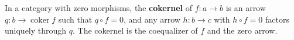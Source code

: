 In a category with zero morphisms, the \textbf{cokernel} of $f: a \rightarrow b$ is an arrow $q: b \rightarrow \operatorname{coker} f$ such that $q \circ f = 0$, and any arrow $h: b \rightarrow c$ with $h \circ f = 0$ factors uniquely through $q$. The cokernel is the coequalizer of $f$ and the zero arrow.